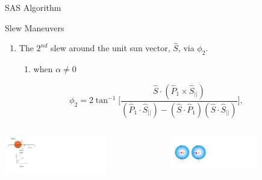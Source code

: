 \documentclass{beamer}
\begin{document}
%
\begin{frame}{SAS Algorithm}
\begin{block}{Slew Maneuvers}
\begin{enumerate}[II]
\item The $2^{nd}$ slew around the unit sun vector, $\hat{S}$, via $\phi_2$.
\begin{enumerate}[a]
\item when $\alpha\neq0$
\end{enumerate}
\end{enumerate}
\begin{equation}
\phi_2=2\tan^{-1}\Big[ \frac{\hat{S}\cdot (\hat{P}_1\times\hat{S}_{||})}{(\hat{P}_1\cdot\hat{S}_{||})-(\hat{S}\cdot\hat{P}_1)(\hat{S}\cdot\hat{S}_{||})}\Big],
\end{equation}


\begin{columns}
	\begin{column}{0.5\textwidth}
		\begin{center}
			\includegraphics[width=1.75in]{./Figures/SVAS_2r_modified}
		\end{center}
	\end{column}
	\begin{column}{0.5\textwidth}  %
		\begin{center}
			\includegraphics[width=1.5in]{./Figures/SASSchematic4}
		\end{center}
	\end{column}
\end{columns}



\end{block}
\end{frame}
\end{document}
